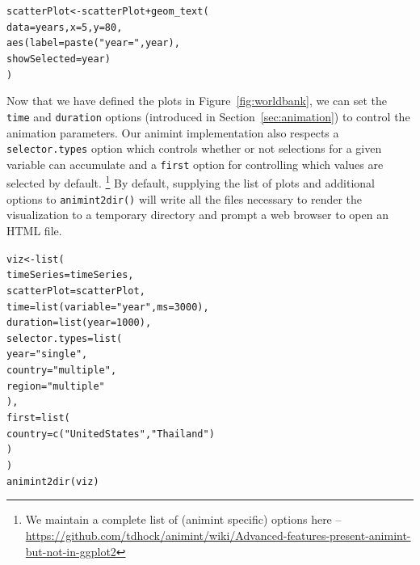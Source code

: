 \documentclass[journal]{vgtc}\usepackage[]{graphicx}\usepackage[]{color}
\makeatletter
\newcommand{\hlnum}[1]{\textcolor[rgb]{0,0,0}{#1}}%
\newcommand{\hlstr}[1]{\textcolor[rgb]{0.502,0,0}{#1}}%
\newcommand{\hlopt}[1]{\textcolor[rgb]{0,0,0}{#1}}%
\newcommand{\hlstd}[1]{\textcolor[rgb]{0,0,0}{#1}}%
\newcommand{\hlkwb}[1]{\textcolor[rgb]{0,0,0}{#1}}%
\newcommand{\hlkwc}[1]{\textcolor[rgb]{0,0,1}{#1}}%
\newcommand{\hlkwd}[1]{\textcolor[rgb]{0,0,0}{#1}}%
\newenvironment{kframe}{%
 \def\at@end@of@kframe{}%
 \ifinner\ifhmode%
  \def\at@end@of@kframe{\end{minipage}}%
  \begin{minipage}{\columnwidth}%
 \fi\fi%
 \def\FrameCommand##1{\hskip\@totalleftmargin \hskip-\fboxsep
 \colorbox{shadecolor}{##1}\hskip-\fboxsep
     \hskip-\linewidth \hskip-\@totalleftmargin \hskip\columnwidth}%
 \MakeFramed {\advance\hsize-\width
   \@totalleftmargin\z@ \linewidth\hsize
   \@setminipage}}%
 {\par\unskip\endMakeFramed%
 \at@end@of@kframe}
\newenvironment{knitrout}{}{} %
\makeatother
\begin{document}
\begin{knitrout}
\color{fgcolor}\begin{kframe}
\begin{alltt}
\hlstd{scatterPlot} \hlkwb{<-} \hlstd{scatterPlot} \hlopt{+} \hlkwd{geom_text}\hlstd{(}
  \hlkwc{data} \hlstd{= years,} \hlkwc{x} \hlstd{=} \hlnum{5}\hlstd{,} \hlkwc{y} \hlstd{=} \hlnum{80}\hlstd{,}
  \hlkwd{aes}\hlstd{(}\hlkwc{label} \hlstd{=} \hlkwd{paste}\hlstd{(}\hlstr{"year ="}\hlstd{, year),}
      \hlkwc{showSelected} \hlstd{= year)}
\hlstd{)}
\end{alltt}
\end{kframe}
\end{knitrout}

Now that we have defined the plots in Figure~\ref{fig:worldbank}, we can set
the \texttt{time} and \texttt{duration} options (introduced in 
Section~\ref{sec:animation}) to control the animation parameters. Our animint
implementation also respects a \texttt{selector.types} option which controls
whether or not selections for a given variable can accumulate and a 
\texttt{first} option for controlling which values are selected by default.
\footnote{We maintain a complete list of (animint specific) options here --
\url{https://github.com/tdhock/animint/wiki/Advanced-features-present-animint-but-not-in-ggplot2}} 
By default, supplying the list of plots and additional options to 
\texttt{animint2dir()} will write all the files necessary to render 
the visualization to a temporary directory and prompt a web browser to 
open an HTML file.

\begin{knitrout}
\color{fgcolor}\begin{kframe}
\begin{alltt}
\hlstd{viz} \hlkwb{<-} \hlkwd{list}\hlstd{(}
  \hlkwc{timeSeries} \hlstd{= timeSeries,}
  \hlkwc{scatterPlot} \hlstd{= scatterPlot,}
  \hlkwc{time} \hlstd{=} \hlkwd{list}\hlstd{(}\hlkwc{variable} \hlstd{=} \hlstr{"year"}\hlstd{,} \hlkwc{ms} \hlstd{=} \hlnum{3000}\hlstd{),}
  \hlkwc{duration} \hlstd{=} \hlkwd{list}\hlstd{(}\hlkwc{year} \hlstd{=} \hlnum{1000}\hlstd{),}
  \hlkwc{selector.types} \hlstd{=} \hlkwd{list}\hlstd{(}
    \hlkwc{year} \hlstd{=} \hlstr{"single"}\hlstd{,}
    \hlkwc{country} \hlstd{=} \hlstr{"multiple"}\hlstd{,}
    \hlkwc{region} \hlstd{=} \hlstr{"multiple"}
  \hlstd{),}
  \hlkwc{first} \hlstd{=} \hlkwd{list}\hlstd{(}
    \hlkwc{country} \hlstd{=} \hlkwd{c}\hlstd{(}\hlstr{"United States"}\hlstd{,} \hlstr{"Thailand"}\hlstd{)}
  \hlstd{)}
\hlstd{)}
\hlkwd{animint2dir}\hlstd{(viz)}
\end{alltt}
\end{kframe}
\end{knitrout}
\end{document}
